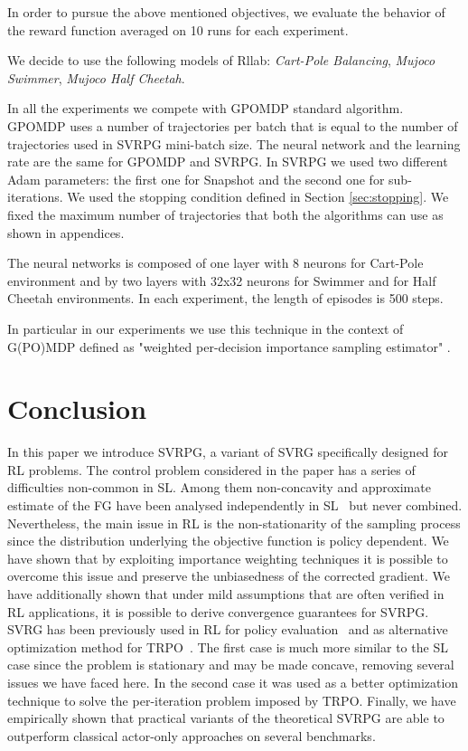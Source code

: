 \documentclass{article}
\makeatletter
\theoremstyle{remark}
\theoremstyle{definition}
\DeclareRobustCommand{\eg}{e.g.,\@\xspace}
\makeatother
\begin{document}
In order to pursue the above mentioned objectives, we evaluate the behavior of the reward function averaged on 10 runs for each experiment.

We decide to use the following models of Rllab: \emph{Cart-Pole Balancing}, \emph{Mujoco Swimmer}, \emph{Mujoco Half Cheetah}.


In all the experiments we compete with GPOMDP standard algorithm. GPOMDP uses a number of trajectories per batch that is equal to the number of trajectories used in SVRPG mini-batch size.
The neural network and the learning rate are the same for GPOMDP and SVRPG.
In SVRPG we used two different Adam parameters: the first one for Snapshot and the second one for sub-iterations.
We used the stopping condition defined in Section \ref{sec:stopping}.
We fixed the maximum number of trajectories that both the algorithms can use as shown in appendices. 

The neural networks is composed of one layer with 8 neurons for Cart-Pole environment and by two layers with 32x32 neurons for Swimmer and for Half Cheetah environments. In each experiment, the length of episodes is 500 steps.

In particular in our experiments we use this technique in the context of G(PO)MDP defined as "weighted per-decision importance sampling estimator" \cite{precup2000eligibility}.  

\section{Conclusion}
In this paper we introduce SVRPG, a variant of SVRG specifically designed for RL problems.
The control problem considered in the paper has a series of difficulties non-common in SL.
Among them non-concavity and approximate estimate of the FG have been analysed independently in SL~\citep[\eg][]{allen2016variance,reddi2016stochastic,harikandeh2015stopwasting} but never combined.
Nevertheless, the main issue in RL is the non-stationarity of the sampling process since the distribution underlying the objective function is policy dependent.
We have shown that by exploiting importance weighting techniques it is possible to overcome this issue and preserve the unbiasedness of the corrected gradient.
We have additionally shown that under mild assumptions that are often verified in RL applications, it is possible to derive convergence guarantees for SVRPG.
SVRG has been previously used in RL for policy evaluation~\citep{du2017svrgpe} and as alternative optimization method for TRPO~\citep{xu2017svrgtrpo}.
The first case is much more similar to the SL case since the problem is stationary and may be made concave, removing several issues we have faced here.
In the second case it was used as a better optimization technique to solve the per-iteration problem imposed by TRPO.
Finally, we have empirically shown that practical variants of the theoretical SVRPG are able to outperform classical actor-only approaches on several benchmarks.
\end{document}

